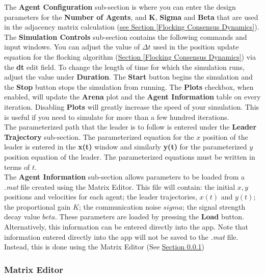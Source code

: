 \documentclass[../CourseManual.tex]{subfiles}
\begin{document}
The \textbf{Agent Configuration} sub-section is where you can enter the design parameters for the \textbf{Number of Agents}, and \textbf{K}, \textbf{Sigma} and \textbf{Beta} that are used in the adjacency matrix calculation (\hyperref[Flocking Consensus Dynamics]{see Section \ref{Flocking Consensus Dynamics}}).\\

The \textbf{Simulation Controls} sub-section contains the following commands and input windows. You can adjust the value of $\Delta t$ used in the position update equation for the flocking algorithm (\hyperref[Flocking Consensus Dynamics]{Section \ref{Flocking Consensus Dynamics}}) via the \textbf{dt} edit field. To change the length of time for which the simulation runs, adjust the value under \textbf{Duration}. The \textbf{Start} button begins the simulation and the \textbf{Stop} button stops the simulation from running. The \textbf{Plots} checkbox, when enabled, will update the \textbf{Arena} plot and the \textbf{Agent Information} table on every iteration. Disabling \textbf{Plots} will greatly increase the speed of your simulation. This is useful if you need to simulate for more than a few hundred iterations.\\

The parameterized path that the leader is to follow is entered under the \textbf{Leader Trajectory} sub-section. The parameterized equation for the $x$ position of the leader is entered in the \textbf{x(t)} window and similarly \textbf{y(t)} for the parameterized $y$ position equation of the leader. The parameterized equations must be written in terms of $t$.\\

The \textbf{Agent Information} sub-section allows parameters to be loaded from a \textit{.mat} file created using the Matrix Editor. This file will contain: the initial $x, y$ positions and velocities for each agent; the leader trajectories, $x(t)$ and $y(t)$; the proportional gain $K$; the communication noise $sigma$; the signal strength decay value $beta$. These parameters are loaded by pressing the \textbf{Load} button. Alternatively, this information can be entered directly into the app. Note that information entered directly into the app will not be saved to the \textit{.mat} file. Instead, this is done using the Matrix Editor (See \hyperref[Matrix Editor: Flocking]{Section \ref{Matrix Editor: Flocking}}) \\

\subsubsection{Matrix Editor} \label{Matrix Editor: Flocking}
\end{document}
